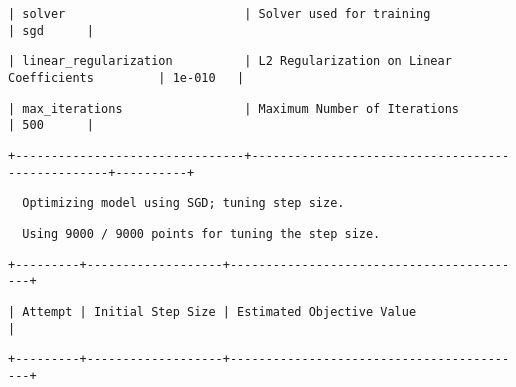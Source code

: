 \documentclass[11pt]{article}
\begin{document}
    
    
    \begin{verbatim}
| solver                         | Solver used for training                         | sgd      |
    \end{verbatim}

    
    
    \begin{verbatim}
| linear_regularization          | L2 Regularization on Linear Coefficients         | 1e-010   |
    \end{verbatim}

    
    
    \begin{verbatim}
| max_iterations                 | Maximum Number of Iterations                     | 500      |
    \end{verbatim}

    
    
    \begin{verbatim}
+--------------------------------+--------------------------------------------------+----------+
    \end{verbatim}

    
    
    \begin{verbatim}
  Optimizing model using SGD; tuning step size.
    \end{verbatim}

    
    
    \begin{verbatim}
  Using 9000 / 9000 points for tuning the step size.
    \end{verbatim}

    
    
    \begin{verbatim}
+---------+-------------------+------------------------------------------+
    \end{verbatim}

    
    
    \begin{verbatim}
| Attempt | Initial Step Size | Estimated Objective Value                |
    \end{verbatim}

    
    
    \begin{verbatim}
+---------+-------------------+------------------------------------------+
    \end{verbatim}
\end{document}
